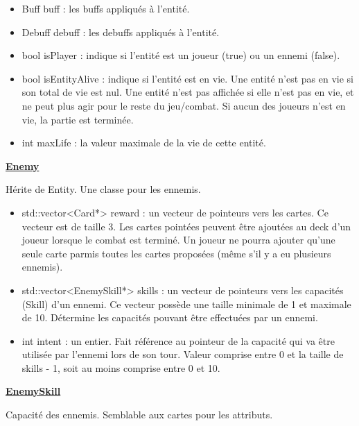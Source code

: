\begin{itemize}
    \item Buff buff : les buffs appliqués à l'entité.
    \item Debuff debuff : les debuffs appliqués à l'entité.
    \item bool isPlayer : indique si l'entité est un joueur (true) ou un ennemi (false).
    \item bool isEntityAlive : indique si l'entité est en vie. Une entité n'est pas en vie si son total de vie est nul. Une entité n'est pas affichée si elle n'est pas en vie, et ne peut plus agir pour le reste du jeu/combat. Si aucun des joueurs n'est en vie, la partie est terminée.
    \item int maxLife : la valeur maximale de la vie de cette entité.
\end{itemize}


\underline{\textbf{Enemy}}
\par Hérite de Entity. Une classe pour les ennemis. 
\begin{itemize}
    \item std::vector<Card*> reward : un vecteur de pointeurs vers les cartes. Ce vecteur est de taille 3. Les cartes pointées peuvent être ajoutées au deck d'un joueur lorsque le combat est terminé. Un joueur ne pourra ajouter qu'une seule carte parmis toutes les cartes proposées (même s'il y a eu plusieurs ennemis).
    \item std::vector<EnemySkill*>  skills : un vecteur de pointeurs vers les capacités (Skill) d'un ennemi. Ce vecteur possède une taille minimale de 1 et maximale de 10. Détermine les capacités pouvant être effectuées par un ennemi.
    \item int intent : un entier. Fait référence au pointeur de la capacité qui va être utilisée par l'ennemi lors de son tour. Valeur comprise entre 0 et la taille de skills - 1, soit au moins comprise entre 0 et 10. 
\end{itemize}

\underline{\textbf{EnemySkill}}
\par Capacité des ennemis. Semblable aux cartes pour les attributs.

